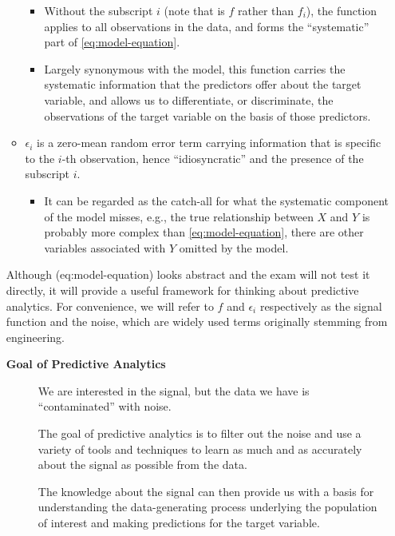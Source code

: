 \documentclass[
  10pt,
]{krantz}
\providecommand{\tightlist}{%
  \setlength{\itemsep}{0pt}\setlength{\parskip}{0pt}}
\begin{document}
\begin{itemize}
\begin{itemize}
    \begin{itemize}
    \tightlist
    \item
      Without the subscript \(i\) (note that is \(f\) rather than \(f_i\)), the
      function applies to all observations in the data, and forms the
      ``systematic'' part of \eqref{eq:model-equation}.
    \item
      Largely synonymous with the model, this function carries the
      systematic information that the predictors offer about the target
      variable, and allows us to differentiate, or discriminate, the
      observations of the target variable on the basis of those
      predictors.
    \end{itemize}
  \item
    \(\epsilon_i\) is a zero-mean random error term carrying information that
    is specific to the \(i\)-th observation, hence ``idiosyncratic'' and the
    presence of the subscript \(i\).

    \begin{itemize}
    \tightlist
    \item
      It can be regarded as the catch-all for what the systematic
      component of the model misses, e.g., the true relationship between
      \(X\) and \(Y\) is probably more complex than \eqref{eq:model-equation},
      there are other variables associated with \(Y\) omitted by the model.
    \end{itemize}
  \end{itemize}

  Although \citet{ref}(eq:model-equation) looks abstract and the exam will not test
  it directly, it will provide a useful framework for thinking about
  predictive analytics. For convenience, we will refer to \(f\) and \(\epsilon_i\)
  respectively as the signal function and the noise, which are widely used
  terms originally stemming from engineering.

  \begin{description}
  \item[\textbf{Goal of Predictive Analytics}]
  We are interested in the signal, but the data we have is ``contaminated''
  with noise.

  The goal of predictive analytics is to filter out the noise and use a
  variety of tools and techniques to learn as much and as accurately about
  the signal as possible from the data.

  The knowledge about the signal can then provide us with a basis for
  understanding the data-generating process underlying the population of
  interest and making predictions for the target variable.
  \end{description}
\end{itemize}
\end{document}
